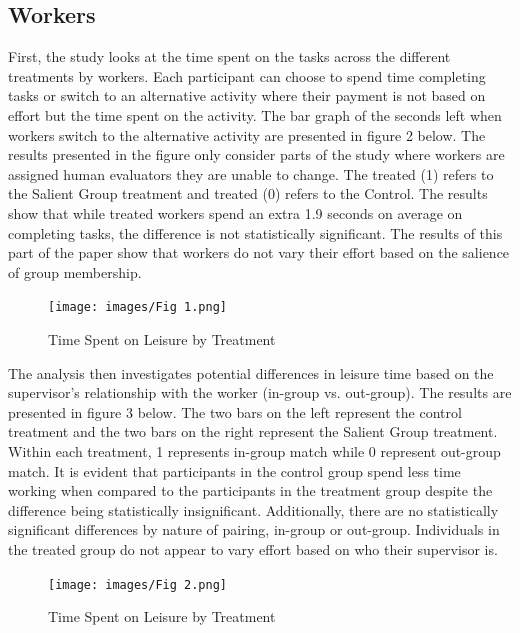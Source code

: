 



\subsection{Workers}
First, the study looks at the time spent on the tasks across the different treatments by workers. Each participant can choose to spend time completing tasks or switch to an alternative activity where their payment is not based on effort but the time spent on the activity. The bar graph of the seconds left when workers switch to the alternative activity are presented in figure 2 below. The results presented in the figure only consider parts of the study where workers are assigned human evaluators they are unable to change. The treated (1) refers to the Salient Group treatment and treated (0) refers to the Control.  The results show that while treated workers spend an extra 1.9 seconds on average on completing tasks, the difference is not statistically significant. The results of this part of the paper show that workers do not vary their effort based on the salience of group membership. 

\begin{figure}[H]
 \captionsetup{justification=raggedright,singlelinecheck=false}
\caption{Time Spent on Leisure by Treatment}
\texttt{[image: images/Fig 1.png]} 
\end{figure}

The analysis then investigates potential differences in leisure time based on the supervisor's relationship with the worker (in-group vs. out-group). The results are presented in figure 3 below. The two bars on the left represent the control treatment and the two bars on the right represent the Salient Group treatment. Within each treatment, 1 represents in-group match while 0 represent out-group match. It is evident that participants in the control group spend less time working when compared to the participants in the treatment group despite the difference being statistically insignificant. Additionally, there are no statistically significant differences by nature of pairing, in-group or out-group. Individuals in the treated group do not appear to vary effort based on who their supervisor is. 

\begin{figure}[H]
 \captionsetup{justification=raggedright,singlelinecheck=false}
\caption{Time Spent on Leisure by Treatment}
\texttt{[image: images/Fig 2.png]} 
\end{figure}

